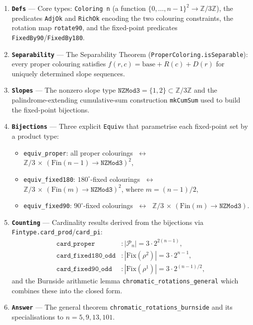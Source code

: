 \documentclass{article}
\newcommand{\calP}{\mathcal{P}}
\newcommand{\Fix}{\mathrm{Fix}}
\begin{document}
\begin{enumerate}[leftmargin=2em]
  \item \textbf{\texttt{Defs}} --- Core types:
    \texttt{Coloring~n} (a function
    $\{0,\ldots,n-1\}^2\to\mathbb{Z}/3\mathbb{Z}$),
    the predicates \texttt{AdjOk} and \texttt{RichOk}
    encoding the two colouring constraints,
    the rotation map \texttt{rotate90}, and the fixed-point
    predicates \texttt{FixedBy90}/\texttt{FixedBy180}.

  \item \textbf{\texttt{Separability}} --- The Separability
    Theorem (\texttt{ProperColoring.isSeparable}):
    every proper colouring satisfies
    $f(r,c) = \mathrm{base} + R(c) + D(r)$
    for uniquely determined slope sequences.

  \item \textbf{\texttt{Slopes}} --- The nonzero slope type
    $\texttt{NZMod3} = \{1,2\}\subset\mathbb{Z}/3\mathbb{Z}$
    and the palindrome-extending cumulative-sum construction
    \texttt{mkCumSum} used to build the fixed-point bijections.

  \item \textbf{\texttt{Bijections}} --- Three explicit
    \texttt{Equiv}s that parametrise each fixed-point set
    by a product type:
    \begin{itemize}
      \item \texttt{equiv\_proper}: all proper colourings
        $\;\longleftrightarrow\;$
        $\mathbb{Z}/3\,\times\,
        (\mathrm{Fin}(n{-}1)\to\texttt{NZMod3})^2$,
      \item \texttt{equiv\_fixed180}: $180^\circ$-fixed
        colourings $\;\longleftrightarrow\;$
        $\mathbb{Z}/3\,\times\,
        (\mathrm{Fin}(m)\to\texttt{NZMod3})^2$,
        where $m=(n{-}1)/2$,
      \item \texttt{equiv\_fixed90}: $90^\circ$-fixed
        colourings $\;\longleftrightarrow\;$
        $\mathbb{Z}/3\,\times\,
        (\mathrm{Fin}(m)\to\texttt{NZMod3})$.
    \end{itemize}

  \item \textbf{\texttt{Counting}} --- Cardinality results
    derived from the bijections via
    \texttt{Fintype.card\_prod}/\texttt{card\_pi}:
    \begin{align*}
      \texttt{card\_proper}
        &: |\calP_n| = 3\cdot 2^{2(n-1)},\\
      \texttt{card\_fixed180\_odd}
        &: |\Fix(\rho^2)| = 3\cdot 2^{n-1},\\
      \texttt{card\_fixed90\_odd}
        &: |\Fix(\rho^1)| = 3\cdot 2^{(n-1)/2},
    \end{align*}
    and the Burnside arithmetic lemma
    \texttt{chromatic\_rotations\_general} which combines
    these into the closed form.

  \item \textbf{\texttt{Answer}} --- The general theorem
    \texttt{chromatic\_rotations\_burnside} and its
    specialisations to $n=5,9,13,101$.
\end{enumerate}
\end{document}
